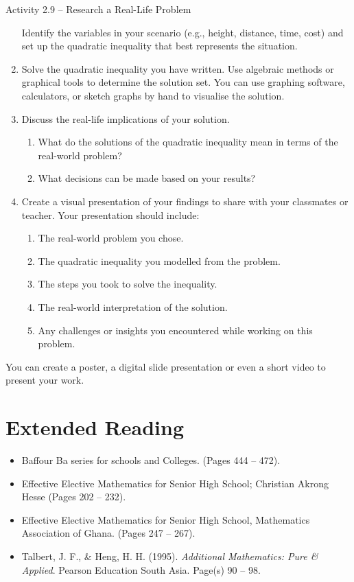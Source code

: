 \begin{activity}{Activity 2.9 -- Research a Real-Life Problem}
\begin{enumerate}
  Identify the variables in your scenario (e.g., height, distance, time, cost)
  and set up the quadratic inequality that best represents the situation.
  \item Solve the quadratic inequality you have written. Use algebraic methods
  or graphical tools to determine the solution set. You can use graphing
  software, calculators, or sketch graphs by hand to visualise the solution.
  \item Discuss the real-life implications of your solution.
  \begin{enumerate}
    \item[a.] What do the solutions of the quadratic inequality mean in terms of
    the real-world problem?
    \item[b.] What decisions can be made based on your results?
  \end{enumerate}
  \item Create a visual presentation of your findings to share with your classmates
  or teacher. Your presentation should include:
  \begin{enumerate}
    \item[a.] The real-world problem you chose.
    \item[b.] The quadratic inequality you modelled from the problem.
    \item[c.] The steps you took to solve the inequality.
    \item[d.] The real-world interpretation of the solution.
    \item[e.] Any challenges or insights you encountered while working on this
    problem.
  \end{enumerate}
\end{enumerate}
You can create a poster, a digital slide presentation or even a short video to
present your work.
\end{activity}

\section*{Extended Reading}
\begin{itemize}
  \item Baffour Ba series for schools and Colleges. (Pages 444 -- 472).
  \item Effective Elective Mathematics for Senior High School; Christian Akrong
  Hesse (Pages 202 -- 232).
  \item Effective Elective Mathematics for Senior High School, Mathematics
  Association of Ghana. (Pages 247 -- 267).
  \item Talbert, J. F., \& Heng, H. H. (1995). \textit{Additional Mathematics: Pure \&
  Applied}. Pearson Education South Asia. Page(s) 90 -- 98.
\end{itemize}
